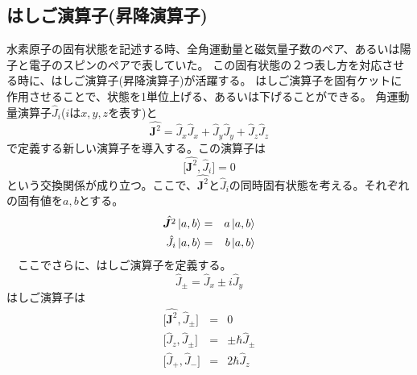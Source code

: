 \documentclass[11pt,a4paper]{jsarticle}
\begin{document}

\clearpage

\begin{boxnote}
  \subsection*{はしご演算子(昇降演算子)}
  水素原子の固有状態を記述する時、全角運動量と磁気量子数のペア、あるいは陽子と電子のスピンのペアで表していた。
  この固有状態の２つ表し方を対応させる時に、はしご演算子(昇降演算子)が活躍する。
  はしご演算子を固有ケットに作用させることで、状態を1単位上げる、あるいは下げることができる。
  角運動量演算子$\hat{J}_i$($i$は$x,y,z$を表す)と
  \begin{equation}
    \hat{\bm{J}^2} = \hat{J}_x \hat{J}_x + \hat{J}_y \hat{J}_y + \hat{J}_z \hat{J}_z
  \end{equation}
  で定義する新しい演算子を導入する。この演算子は
  \begin{equation}
    \bigl[\hat{\bm{J}^2},\hat{J}_i\bigr] = 0
  \end{equation}
  という交換関係が成り立つ。ここで、$\hat{\bm{J}^2}$と$\hat{J}_i$の同時固有状態を考える。それぞれの固有値を$a,b$とする。
  \begin{eqnarray}
    \hat{\bm{J}^2} \ket{a,b} &=& a \ket{a,b}\\
    \hat{J}_i \ket{a,b} &=& b \ket{a,b}
  \end{eqnarray}
　ここでさらに、はしご演算子を定義する。
 \begin{equation}
   \hat{J}_\pm = \hat{J}_x \pm i \hat{J}_y
 \end{equation}
 はしご演算子は
 \begin{eqnarray}
   \bigl[\hat{\bm{J}^2},\hat{J}_\pm \bigr] &=& 0 \\
   \bigl[\hat{J}_z,\hat{J}_\pm \bigr] &=& \pm \hbar \hat{J}_\pm \\
   \bigl[\hat{J}_+,\hat{J}_- \bigr] &=& 2 \hbar \hat{J}_z
 \end{eqnarray}

\end{boxnote}
\end{document}
